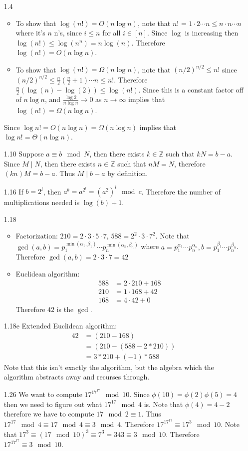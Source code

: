 \documentclass[12pt, letterpaper]{article}
\newcommand{\Z}{\mathbb{Z}}
\begin{document}
\begin{enumerate}
	\item[1.4] 
	\begin{itemize}
		\item To show that $\log(n!) = O(n \log n)$, note that $n!$ = $1\cdot2\cdots n
		\leq n \cdot n \cdots n$ where it's $n$ n's, since $i \leq n$ for all 
		$i \in [n]$.  Since $\log$ is increasing then $\log(n!) \leq \log(n^n) = n \log(n)$.  Therefore $\log(n!) = O(n \log n)$.
		\item To show that $\log(n!) = \Omega(n \log n)$, note that $(n/2)^{n/2}\leq n!$
		since $(n/2)^{n/2} \leq \frac{n}{2}(\frac{n}{2} +1)\cdots n \leq n!$.  Therefore
		$\frac{n}{2}(\log(n)-\log(2)) \leq \log(n!)$.  Since this is a constant factor 
		off of $n \log  n$, and $\frac{\log 2}{n \log n} \to 0$ as $n \to \infty$ 
		implies that $\log(n!) = \Omega(n \log n)$.
	\end{itemize}
	Since $\log n! = O(n \log n) = \Omega(n \log n)$ implies that $\log n! = 
	\Theta(n \log n)$.
	\item[1.10]Suppose $a \equiv b \mod{N}$, then there exists $k \in \Z$ such that 
	$kN = b - a$.  Since $M \mid N$, then there exists $n \in \Z$ such that 
	$nM = N$, therefore $(kn)M = b - a$.  Thus $M \mid b - a$ by definition.
	\item[1.16]	If $b = 2^l$, then $a^b = a^{2^l} = (a^2)^l \mod{c}$.  Therefore 
	the number of multiplications needed is $\log(b) + 1$.  
	\item[1.18]
	\begin{itemize}
		\item Factorization: $210 = 2 \cdot 3 \cdot 5 \cdot 7$, 
		$588 = 2^2 \cdot 3 \cdot 7^2$.  Note that $\gcd(a,b) = p_1^{\min(\alpha_1,\beta_1)}\cdots p_n^{\min(\alpha_n,\beta_n)}$ where $a = p_1^{\alpha_1}\cdots p_n^{\alpha_n}, b = p_1^{\beta_1}\cdots p_n^{\beta_n}$.  Therefore 
		$\gcd(a,b) = 2 \cdot 3 \cdot 7 = 42$
		\item Euclidean algorithm: 
		\begin{align*}
			588 &= 2 \cdot 210 + 168\\
			210 &= 1\cdot 168 + 42\\
			168 &= 4 \cdot 42 + 0
		\end{align*}
		Therefore $42$ is the $\gcd$.
	\end{itemize}
	\item[1.18e] Extended Euclidean algorithm: 
	\begin{align*}
		42 &= (210 - 168)\\
		&= (210 - (588 - 2 * 210))\\
		&= 3*210 + (-1)*588
	\end{align*}
	Note that this isn't exactly the algorithm, but the algebra which the algorithm
	abstracts away and recurses through.  
	\item[1.26] We want to compute $17^{17^{17}} \mod 10$.  Since 
	$\phi(10) = \phi(2)\phi(5) = 4$ then we need to figure out what $17^{17} \mod 4$ is.
	Note that $\phi(4) = 4 - 2$ therefore we have to compute $17\mod 2 \equiv 1$.  
	Thus $17^{17} \mod 4 \equiv 17 \mod 4 \equiv 3 \mod 4$.  Therefore 
	$17^{17^{17}} \equiv 17^3 \mod 10$.   Note that 
	$17^3 \equiv (17 \mod 10)^3 \equiv 7^3 = 343 \equiv 3 \mod{10}$.  
	Therefore $17^{17^{17}} \equiv 3 \mod 10$.  
\end{enumerate}
\end{document}

